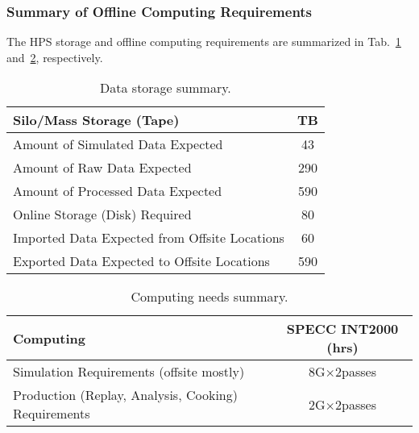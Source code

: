 \subsubsection{Summary of Offline Computing Requirements}

The HPS storage and offline computing requirements are summarized in Tab.~\ref{tab:datastorage} 
and~\ref{tab:computing}, respectively.
\begin{table}[tbp]
\centering
\begin{tabular}{|l|c|}
\hline
Silo/Mass Storage (Tape) & TB \\
\hline
Amount of Simulated Data Expected & 43 \\
\hline
Amount of Raw Data Expected & 290 \\
\hline
Amount of Processed Data Expected & 590 \\
\hline
Online Storage (Disk) Required & 80 \\
\hline
Imported Data Expected from Offsite Locations & 60 \\
\hline
Exported Data Expected to Offsite Locations&590 \\
\hline
\end{tabular}
\caption{{\small Data storage summary.}}
\label{tab:datastorage}
\end{table}
\begin{table}[tbp]
\centering
\begin{tabular}{|l|c|}
\hline
Computing & SPECC INT2000 (hrs) \\
\hline
Simulation Requirements (offsite mostly)&8G$\times$2passes\\
\hline
Production (Replay, Analysis, Cooking) Requirements & 2G$\times$2passes\\
\hline
\end{tabular}
\caption{{\small Computing needs summary.}}
\label{tab:computing}
\end{table}
